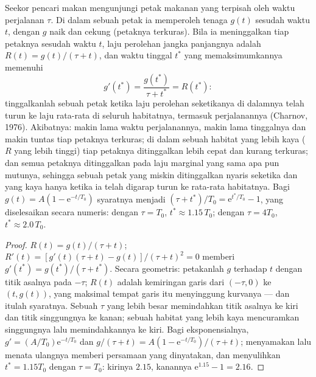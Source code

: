 \begin{theorem}\label{thm:b3:behavioural-ecology:mvt}
%
Seekor pencari makan mengunjungi petak makanan yang terpisah oleh waktu perjalanan $\tau$. Di dalam sebuah
petak ia memperoleh tenaga $g(t)$ sesudah waktu $t$, dengan $g$ naik dan
cekung (petaknya terkuras). Bila ia meninggalkan tiap petaknya sesudah waktu $t$,
laju perolehan jangka panjangnya adalah $R(t) = g(t)/(\tau + t)$, dan waktu tinggal
$t^{*}$ yang memaksimumkannya memenuhi
\[
g'(t^{*}) = \frac{g(t^{*})}{\tau + t^{*}} = R(t^{*}) :
\]
tinggalkanlah sebuah petak ketika laju perolehan seketikanya di dalamnya telah turun ke
laju rata-rata di seluruh habitatnya, termasuk perjalanannya (Charnov,
1976). Akibatnya: makin lama waktu perjalanannya, makin lama tinggalnya
dan makin tuntas tiap petaknya terkuras; di dalam sebuah habitat yang lebih kaya
($R$ yang lebih tinggi) tiap petaknya ditinggalkan lebih cepat dan kurang terkuras; dan semua
petaknya ditinggalkan pada laju marginal yang sama apa pun mutunya, sehingga
sebuah petak yang miskin ditinggalkan nyaris seketika dan yang kaya hanya ketika ia
telah digarap turun ke rata-rata habitatnya. Bagi $g(t) = A(1 -
\mathrm{e}^{-t/T_{0}})$ syaratnya menjadi $(\tau + t^{*})/T_{0} =
\mathrm{e}^{t^{*}/T_{0}} - 1$, yang diselesaikan secara numeris: dengan $\tau = T_{0}$,
$t^{*} \approx 1.15\,T_{0}$; dengan $\tau = 4T_{0}$, $t^{*} \approx
2.0\,T_{0}$.
\end{theorem}
\begin{proof}
$R(t) = g(t)/(\tau + t)$; $R'(t) = [g'(t)(\tau + t) - g(t)]/(\tau +
t)^{2} = 0$ memberi $g'(t^{*}) = g(t^{*})/(\tau + t^{*})$. Secara geometris:
petakanlah $g$ terhadap $t$ dengan titik asalnya pada $-\tau$; $R(t)$ adalah kemiringan
garis dari $(-\tau, 0)$ ke $(t, g(t))$, yang maksimal tempat garis itu
menyinggung kurvanya --- dan itulah syaratnya. Sebuah $\tau$ yang lebih besar memindahkan
titik asalnya ke kiri dan titik singgungnya ke kanan; sebuah habitat yang lebih kaya mencuramkan
singgungnya lalu memindahkannya ke kiri. Bagi eksponensialnya, $g' = (A/T_{0})
\mathrm{e}^{-t/T_{0}}$ dan $g/(\tau + t) = A(1 - \mathrm{e}^{-t/T_{0}})/
(\tau + t)$; menyamakan lalu menata ulangnya memberi persamaan yang dinyatakan, dan
menyulihkan $t^{*} = 1.15T_{0}$ dengan $\tau = T_{0}$: kirinya $2.15$, kanannya
$\mathrm{e}^{1.15} - 1 = 2.16$.
\end{proof}

